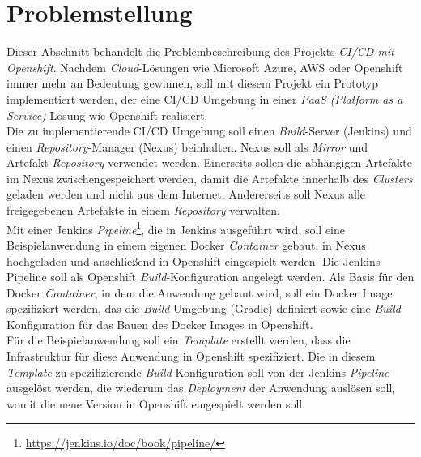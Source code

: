 \section{Problemstellung}
\label{sec:problem-statement}
Dieser Abschnitt behandelt die Problembeschreibung des Projekts \emph{CI/CD mit Openshift}. Nachdem \emph{Cloud}-Lösungen wie Microsoft Azure, AWS oder Openshift immer mehr an Bedeutung gewinnen, soll mit diesem Projekt ein Prototyp implementiert werden, der eine CI/CD Umgebung in einer \emph{PaaS (Platform as a Service)} Lösung wie Openshift realisiert. \\

Die zu implementierende CI/CD Umgebung soll einen \emph{Build}-Server (Jenkins) und einen \emph{Repository}-Manager (Nexus) beinhalten. Nexus soll als \emph{Mirror} und Artefakt-\emph{Repository} verwendet werden. Einerseits sollen die abhängigen Artefakte im Nexus zwischengespeichert werden, damit die Artefakte innerhalb des \emph{Clusters} geladen werden und nicht aus dem Internet. Andererseits soll Nexus alle freigegebenen Artefakte in einem \emph{Repository} verwalten. \\

Mit einer Jenkins \emph{Pipeline}\footnote{\url{https://jenkins.io/doc/book/pipeline/}}, die in Jenkins ausgeführt wird, soll eine Beispielanwendung in einem eigenen Docker \emph{Container} gebaut, in Nexus hochgeladen und anschließend in Openshift eingespielt werden. Die Jenkins Pipeline soll als Openshift \emph{Build}-Konfiguration angelegt werden. Als Basis für den Docker \emph{Container}, in dem die Anwendung gebaut wird, soll ein Docker Image spezifiziert werden, das die \emph{Build}-Umgebung (Gradle) definiert sowie eine \emph{Build}-Konfiguration für das Bauen des Docker Images in Openshift.  \\

Für die Beispielanwendung soll ein \emph{Template} erstellt werden, dass die Infrastruktur für diese Anwendung in Openshift spezifiziert. Die in diesem \emph{Template} zu spezifizierende  \emph{Build}-Konfiguration soll von der Jenkins \emph{Pipeline} ausgelöst werden, die wiederum das \emph{Deployment} der Anwendung auslösen soll, womit die neue Version in Openshift eingespielt werden soll. 